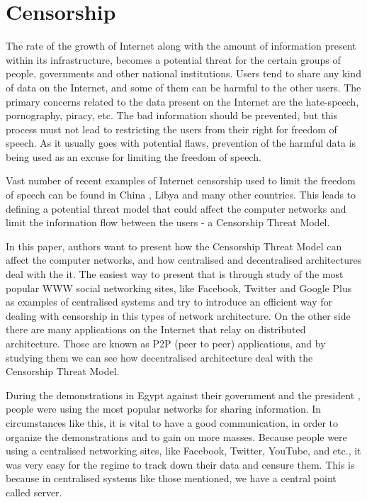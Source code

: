 \section{Censorship}
The rate of the growth of Internet along with the amount of information present within its infrastructure, becomes a potential threat for the certain groups of people, governments and other national institutions. Users tend to share any kind of data on the Internet, and some of them can be harmful to the other users. The primary concerns related to the data present on the Internet are the hate-speech, pornography, piracy, etc. The bad information should be prevented, but this process must not lead to restricting the users from their right for freedom of speech. As it usually goes with potential flaws, prevention of the harmful data is being used as an excuse for limiting the freedom of speech. 

Vast number of recent examples of Internet censorship used to limit the freedom of speech can be found in China \cite{canaves}, Libya \cite{dianotti2011} and many other countries. 
This leads to defining a potential threat model that could affect the computer networks and limit the information flow between the users - a Censorship Threat Model.

In this paper, authors want to present how the Censorship Threat Model can affect the computer networks, and how centralised and decentralised architectures deal with the it. The easiest way to present that is through study of the most popular WWW social networking sites, like Facebook, Twitter and Google Plus as examples of centralised systems and try to introduce an efficient way for dealing with censorship in this types of network architecture. On the other side there are many applications on the Internet that relay on distributed architecture. Those are known as P2P (peer to peer) applications, and by studying them we can see how decentralised architecture deal with the Censorship Threat Model.

During the demonstrations in Egypt against their government and the president \cite{web:scialnetworkcriticalmass}, people were using the most popular networks for sharing information. In circumstances like this, it is vital to have a good communication, in order to organize the demonstrations and to gain on more masses. 
Because people were using a centralised networking sites, like Facebook, Twitter, YouTube, and etc., it was very easy for the regime to track down their data and censure them. This is because in centralised systems like those mentioned, we have a central point called server. 

